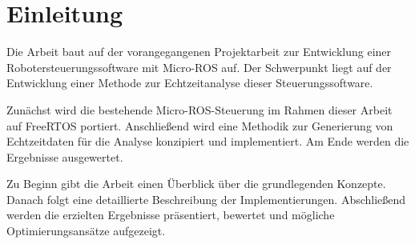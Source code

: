 \section*{Einleitung}

Die Arbeit baut auf der vorangegangenen Projektarbeit zur Entwicklung einer
Robotersteuerungssoftware mit Micro-ROS auf. Der Schwerpunkt liegt auf der
Entwicklung einer Methode zur Echtzeitanalyse dieser Steuerungssoftware.

Zunächst wird die bestehende Micro-ROS-Steuerung im Rahmen dieser Arbeit auf
FreeRTOS portiert. Anschließend wird eine Methodik zur Generierung von
Echtzeitdaten für die Analyse konzipiert und implementiert. Am Ende werden die
Ergebnisse ausgewertet.

Zu Beginn gibt die Arbeit einen Überblick über die grundlegenden Konzepte.
Danach folgt eine detaillierte Beschreibung der Implementierungen. Abschließend
werden die erzielten Ergebnisse präsentiert, bewertet und mögliche
Optimierungsansätze aufgezeigt.
